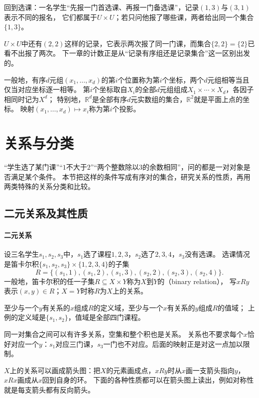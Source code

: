 回到选课：一名学生“先报一门首选课、再报一门备选课”，记录$(1,3)$与$(3,1)$表示不同的报名，
它们都属于$U\times U$；若只问他报了哪些课，两者给出同一个集合$\{1,3\}$。

$U\times U$中还有$(2,2)$这样的记录，它表示两次报了同一门课，而集合$\{2,2\}=\{2\}$已看不出报了两次。
下一章的计数正是从“记录有序组还是记录集合”这一区别出发的。

一般地，有序$d$元组$(x_1,\ldots,x_d)$的第$i$个位置称为第$i$个坐标，两个$d$元组相等当且仅当对应坐标逐一相等。
第$i$个坐标取自$X_i$的全部$d$元组组成$X_1\times\cdots\times X_d$，各因子相同时记为$X^d$；
特别地，$\mathbb R^d$是全部有序$d$元实数组的集合，$\mathbb R^2$就是平面上点的坐标。
映射$(x_1,\ldots,x_d)\mapsto x_i$称为第$i$个投影。

\section{关系与分类}
\label{sec:prelim-binary-relations}

“学生选了某门课”“$1$不大于$2$”“两个整数除以$3$的余数相同”，问的都是一对对象是否满足某个条件。
本节把这样的条件写成有序对的集合，研究关系的性质，再用两类特殊的关系分类和比较。

\subsection{二元关系及其性质}
\label{sec:prelim-binary-relation-definition}
\label{sec:prelim-relation-properties}

\paragraph{二元关系}
设三名学生$s_1,s_2,s_3$中，$s_1$选了课程$1,2,3$，$s_2$选了$2,3,4$，$s_3$没有选课。
选课情况是笛卡尔积$\{s_1,s_2,s_3\}\times\{1,2,3,4\}$的子集
\[
 R=\{(s_1,1),(s_1,2),(s_1,3),(s_2,2),(s_2,3),(s_2,4)\}.
\]
一般地，笛卡尔积的任一子集$R\subseteq X\times Y$称为$X$到$Y$的（binary relation），
写$xRy$表示$(x,y)\in R$；$X=Y$时称$R$为$X$上的关系。

至少与一个$y$有关系的$x$组成$R$的定义域，至少与一个$x$有关系的$y$组成$R$的值域；
上例的定义域是$\{s_1,s_2\}$，值域是全部四门课程。

同一对集合之间可以有许多关系，空集和整个积也是关系。
关系也不要求每个$x$恰好对应一个$y$：$s_1$对应三门课，$s_3$一门也不对应。后面的映射正是对这一点加以限制。

$X$上的关系可以画成箭头图：把$X$的元素画成点，$xRy$时从$x$画一支箭头指向$y$，$xRx$画成从$x$回到自身的环。
下面的各种性质都可以在箭头图上读出，例如对称性就是每支箭头都有反向箭头。


